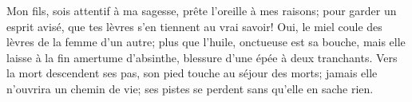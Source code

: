 Mon fils, sois attentif à ma sagesse, prête l’oreille à mes raisons;
	pour garder un esprit avisé, que tes lèvres s’en tiennent au vrai savoir!
Oui, le miel coule des lèvres de la femme d’un autre;
	plus que l’huile, onctueuse est sa bouche,
	mais elle laisse à la fin amertume d’absinthe,
	blessure d’une épée à deux tranchants.
Vers la mort descendent ses pas, son pied touche au séjour des morts;
	jamais elle n’ouvrira un chemin de vie;
	ses pistes se perdent sans qu’elle en sache rien.
